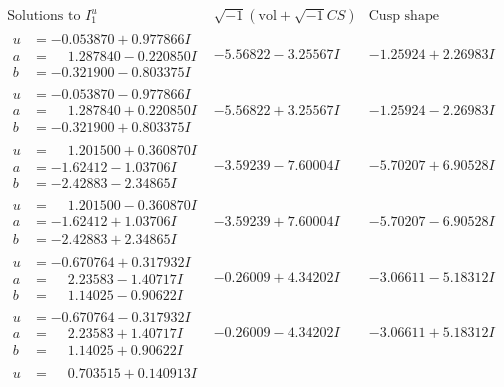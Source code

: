 \documentclass[1p]{elsarticle_modified}
\theoremstyle{definition}
\newcommand{\I}{\sqrt{-1}}
\begin{document}
$$\begin{array}{c|c|c}  
\text{Solutions to }I^u_{1}& \I (\text{vol} + \sqrt{-1}CS) & \text{Cusp shape}\\
 \hline 
\begin{aligned}
u &= -0.053870 + 0.977866 I \\
a &= \phantom{-}1.287840 - 0.220850 I \\
b &= -0.321900 - 0.803375 I\end{aligned}
 & -5.56822 - 3.25567 I & -1.25924 + 2.26983 I \\ \hline\begin{aligned}
u &= -0.053870 - 0.977866 I \\
a &= \phantom{-}1.287840 + 0.220850 I \\
b &= -0.321900 + 0.803375 I\end{aligned}
 & -5.56822 + 3.25567 I & -1.25924 - 2.26983 I \\ \hline\begin{aligned}
u &= \phantom{-}1.201500 + 0.360870 I \\
a &= -1.62412 - 1.03706 I \\
b &= -2.42883 - 2.34865 I\end{aligned}
 & -3.59239 - 7.60004 I & -5.70207 + 6.90528 I \\ \hline\begin{aligned}
u &= \phantom{-}1.201500 - 0.360870 I \\
a &= -1.62412 + 1.03706 I \\
b &= -2.42883 + 2.34865 I\end{aligned}
 & -3.59239 + 7.60004 I & -5.70207 - 6.90528 I \\ \hline\begin{aligned}
u &= -0.670764 + 0.317932 I \\
a &= \phantom{-}2.23583 - 1.40717 I \\
b &= \phantom{-}1.14025 - 0.90622 I\end{aligned}
 & -0.26009 + 4.34202 I & -3.06611 - 5.18312 I \\ \hline\begin{aligned}
u &= -0.670764 - 0.317932 I \\
a &= \phantom{-}2.23583 + 1.40717 I \\
b &= \phantom{-}1.14025 + 0.90622 I\end{aligned}
 & -0.26009 - 4.34202 I & -3.06611 + 5.18312 I \\ \hline\begin{aligned}
u &= \phantom{-}0.703515 + 0.140913 I \\

\end{aligned}
\end{array}$$
\end{document}
